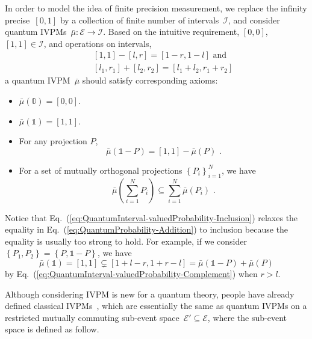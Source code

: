 \documentclass[english,reprint, aps, prl,superscriptaddress, showpacs,
showkeys]{revtex4-1}
\theoremstyle{plain}
\theoremstyle{definition}
\newcommand{\events}{\ensuremath{\mathcal{E}}}
\begin{document}
In order to model the idea of finite precision measurement, we replace
the infinity precise~$[0,1]$ by a collection of finite number of
intervals~$\mathscr{I}$, and consider quantum IVPMs~$\bar{\mu}:\events\rightarrow\mathscr{I}$.
Based on the intuitive requirement, $\left[0,0\right]$, $\left[1,1\right]\in\mathscr{I}$,
and operations on intervals,\begin{subequations}
\begin{eqnarray}
 &  & \left[1,1\right]-\left[l,r\right]=\left[1-r,1-l\right]\textrm{ and}\\
 &  & [l_{1},r_{1}]+[l_{2},r_{2}]=[l_{1}+l_{2},r_{1}+r_{2}]
\end{eqnarray}
\end{subequations}a quantum IVPM~$\bar{\mu}$ should satisfy corresponding
axioms:
\begin{itemize}
\item $\bar{\mu}(\mathbb{0})=\left[0,0\right]$. 
\item $\bar{\mu}(\mathbb{1})=\left[1,1\right]$. 
\item For any projection $P$, 
\begin{equation}
\bar{\mu}\left(\mathbb{1}-P\right)=\left[1,1\right]-\bar{\mu}\left(P\right)\textrm{ .}\label{eq:QuantumInterval-valuedProbability-Complement}
\end{equation}
\item For a set of mutually orthogonal projections $\left\{ P_{i}\right\} _{i=1}^{N}$,
we have 
\begin{equation}
\bar{\mu}\left(\sum_{i=1}^{N}P_{i}\right)\subseteq\sum_{i=1}^{N}\bar{\mu}\left(P_{i}\right)\textrm{ .}\label{eq:QuantumInterval-valuedProbability-Inclusion}
\end{equation}
\end{itemize}
Notice that Eq.~(\ref{eq:QuantumInterval-valuedProbability-Inclusion})
relaxes the equality in Eq.~(\ref{eq:QuantumProbability-Addition})
to inclusion because the equality is usually too strong to hold. For
example, if we consider $\left\{ P_{1},P_{2}\right\} =\left\{ P,\mathbb{1}-P\right\} $,
we have 
\[
\bar{\mu}(\mathbb{1})=\left[1,1\right]\subsetneq\left[1+l-r,1+r-l\right]=\bar{\mu}\left(\mathbb{1}-P\right)+\bar{\mu}\left(P\right)
\]
by Eq.~(\ref{eq:QuantumInterval-valuedProbability-Complement}) when
$r>l$.

Although considering IVPM is new for a quantum theory, people have
already defined classical IVPMs~\citep{JamisonLodwick2004}, which
are essentially the same as quantum IVPMs on a restricted mutually
commuting sub-event space~$\events'\subseteq\events$, where the
sub-event space is defined as follow.
\end{document}
